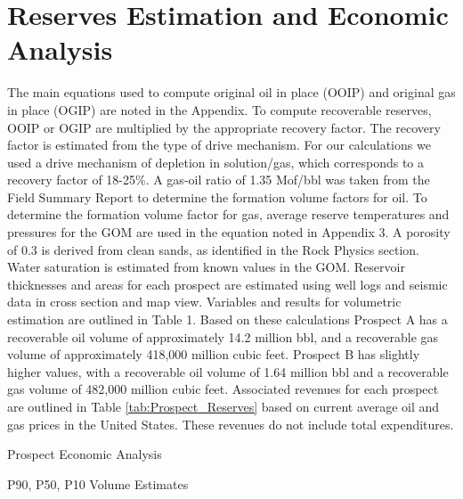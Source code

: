 \documentclass[fleqn]{article}
\begin{document}
\section{Reserves Estimation and Economic Analysis}
The main equations used to compute original oil in place (OOIP) and original gas in place (OGIP) are noted in the Appendix. To compute recoverable reserves, OOIP or OGIP are multiplied by the appropriate recovery factor. The recovery factor is estimated from the type of drive mechanism. For our calculations we used a drive mechanism of depletion in solution/gas, which corresponds to a recovery factor of 18-25\%. A gas-oil ratio of 1.35 Mof/bbl was taken from the Field Summary Report \cite{ESA} to determine the formation volume factors for oil. To determine the formation volume factor for gas, average reserve temperatures and pressures for the GOM are used in the equation noted in Appendix 3. A porosity of 0.3 is derived from clean sands, as identified in the Rock Physics section. Water saturation is estimated from known values in the GOM. Reservoir thicknesses and areas for each prospect are estimated using well logs and seismic data in cross section and map view. Variables and results for volumetric estimation are outlined in Table 1. Based on these calculations Prospect A has a recoverable oil volume of approximately 14.2 million bbl, and a recoverable gas volume of approximately 418,000 million cubic feet. Prospect B has slightly higher values, with a recoverable oil volume of 1.64 million bbl and a recoverable gas volume of 482,000 million cubic feet. Associated revenues for each prospect are outlined in Table \ref{tab:Prospect_Reserves} based on current average oil and gas prices in the United States. These revenues do not include total expenditures.

\begin{table}[H]
    \centering
    \caption{Prospect Economic Analysis}
    \begin{adjustwidth}{-0.12\textwidth}{-0.12\textwidth}
        
        \label{tab:Prospect_Reserves}
    \end{adjustwidth}
\end{table}

\begin{table}[H]
    \centering
    \caption{P90, P50, P10 Volume Estimates}
    \begin{adjustwidth}{-0.12\textwidth}{-0.12\textwidth}
        
        \label{tab:p90}
    \end{adjustwidth}
\end{table}
\end{document}
